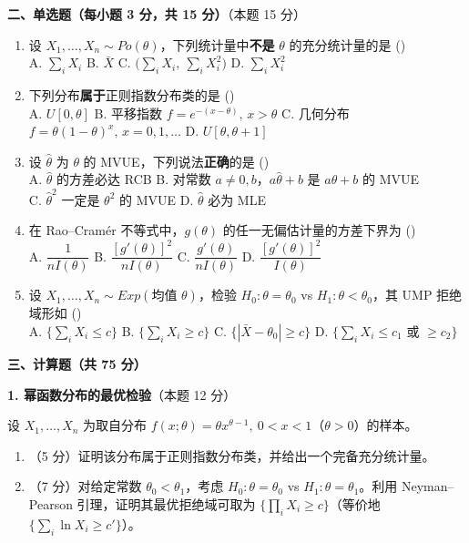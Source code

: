 \documentclass[12pt,a4paper]{ctexart}
\newcommand{\question}[2]{\bigskip\noindent\textbf{#1}\quad（本题 #2 分）\par\nobreak\medskip}
\begin{document}
\question{二、单选题（每小题 3 分，共 15 分）}{15}
\begin{enumerate}[label=\arabic*.,leftmargin=2.0em]
  \item 设 $X_1,\dots,X_n\sim Po(\theta)$，下列统计量中\textbf{不是} $\theta$ 的充分统计量的是 \hfill(\underline{\hspace{1.2cm}})\\
  A. $\sum_i X_i$ \quad B. $\bar X$ \quad C. $\big(\sum_i X_i,\ \sum_i X_i^2\big)$ \quad D. $\sum_i X_i^2$
  \item 下列分布\textbf{属于}正则指数分布类的是 \hfill(\underline{\hspace{1.2cm}})\\
  A. $U[0,\theta]$ \quad B. 平移指数 $f=e^{-(x-\theta)},\,x>\theta$ \quad C. 几何分布 $f=\theta(1-\theta)^{x},\,x=0,1,\dots$ \quad D. $U[\theta,\theta+1]$
  \item 设 $\hat\theta$ 为 $\theta$ 的 MVUE，下列说法\textbf{正确}的是 \hfill(\underline{\hspace{1.2cm}})\\
  A. $\hat\theta$ 的方差必达 RCB \quad B. 对常数 $a\neq 0,b$，$a\hat\theta+b$ 是 $a\theta+b$ 的 MVUE\\
  C. $\hat\theta^2$ 一定是 $\theta^2$ 的 MVUE \quad D. $\hat\theta$ 必为 MLE
  \item 在 Rao--Cramér 不等式中，$g(\theta)$ 的任一无偏估计量的方差下界为 \hfill(\underline{\hspace{1.2cm}})\\
  A. $\dfrac{1}{nI(\theta)}$ \quad B. $\dfrac{[g'(\theta)]^2}{nI(\theta)}$ \quad C. $\dfrac{g'(\theta)}{nI(\theta)}$ \quad D. $\dfrac{[g'(\theta)]^2}{I(\theta)}$
  \item 设 $X_1,\dots,X_n\sim Exp(\text{均值 }\theta)$，检验 $H_0:\theta=\theta_0$ vs $H_1:\theta<\theta_0$，其 UMP 拒绝域形如 \hfill(\underline{\hspace{1.2cm}})\\
  A. $\{\sum_i X_i\le c\}$ \quad B. $\{\sum_i X_i\ge c\}$ \quad C. $\{|\bar X-\theta_0|\ge c\}$ \quad D. $\{\sum_i X_i\le c_1\text{ 或 }\ge c_2\}$
\end{enumerate}

\bigskip
\begin{center}\textbf{三、计算题（共 75 分）}\end{center}

\question{1. 幂函数分布的最优检验}{12}
设 $X_1,\dots,X_n$ 为取自分布 $f(x;\theta)=\theta x^{\theta-1},\ 0<x<1$（$\theta>0$）的样本。
\begin{enumerate}[label=(\arabic*),leftmargin=2.2em]
  \item （5 分）证明该分布属于正则指数分布类，并给出一个完备充分统计量。
  \item （7 分）对给定常数 $\theta_0<\theta_1$，考虑 $H_0:\theta=\theta_0$ vs $H_1:\theta=\theta_1$。利用 Neyman--Pearson 引理，证明其最优拒绝域可取为 $\{\prod_i X_i\ge c\}$（等价地 $\{\sum_i\ln X_i\ge c'\}$）。
\end{enumerate}
\end{document}
